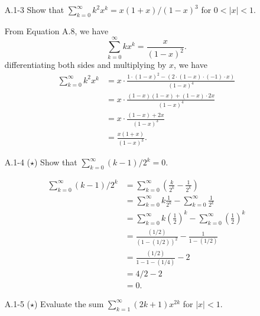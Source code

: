 \documentclass{report}
\makeatletter
\renewenvironment{framed}{%
 \def\FrameCommand##1{\hskip\@totalleftmargin
 \fboxsep=\FrameSep\fbox{##1}}%
 \MakeFramed {\advance\hsize-\width
   \@totalleftmargin\z@ \linewidth\hsize
   \@setminipage}}%
 {\par\unskip\endMakeFramed}
\makeatother
\begin{document}
\begin{enumerate}
\item[A.1{-}3] {Show that $\sum_{k = 0}^{\infty} k^2 x^k = x(1 + x)/(1 - x)^3$
for $0 < |x| < 1$.}

\begin{framed}
From Equation A.8, we have
\[
  \sum_{k = 0}^{\infty} k x^k = \frac{x}{(1 - x)^2}.
\]
differentiating both sides and multiplying by $x$, we have
\begin{equation*}
\begin{aligned}
  \sum_{k = 0}^{\infty} k^2 x^k &= x \cdot \frac{1 \cdot (1 - x)^2 - (2 \cdot (1 - x) \cdot (-1) \cdot x)}{(1 - x)^4}\\
                                &= x \cdot \frac{(1 - x)(1 - x) + (1 - x) \cdot 2x}{(1 - x)^4}\\
                                &= x \cdot \frac{(1 - x) + 2x}{(1 - x)^3}\\
                                &= \frac{x(1 + x)}{(1 - x)^3}.
\end{aligned}
\end{equation*}
\end{framed}

\newpage

\item[A.1{-}4] {($\star$) Show that $\sum_{k = 0}^{\infty} (k - 1)/2^k = 0$.}

\begin{framed}
\begin{equation*}
\begin{aligned}
  \sum_{k = 0}^{\infty} (k - 1)/2^k
  &= \sum_{k = 0}^{\infty} \left( \frac{k}{2^k} - \frac{1}{2^k} \right)\\
  &= \sum_{k = 0}^{\infty} k \frac{1}{2^k} - \sum_{k = 0}^{\infty} \frac{1}{2^k}\\
  &= \sum_{k = 0}^{\infty} k \left( \frac{1}{2} \right)^k - \sum_{k = 0}^{\infty} \left( \frac{1}{2} \right)^k\\
  &= \frac{(1/2)}{(1 - (1/2))^2} - \frac{1}{1 - (1/2)}\\
  &= \frac{(1/2)}{1 - 1 - (1/4)} - 2\\
  &= 4/2 - 2\\
  &= 0.
\end{aligned}
\end{equation*}
\end{framed}

\item[A.1{-}5] {($\star$) Evaluate the sum
$\sum_{k = 1}^{\infty} (2k + 1) x^{2k}$ for $|x| < 1$.}


\end{enumerate}
\end{document}

